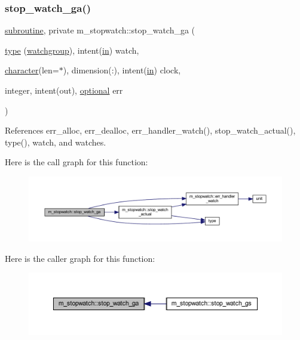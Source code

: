 \subsubsection{\texorpdfstring{stop\+\_\+watch\+\_\+ga()}{stop\_watch\_ga()}}
{\footnotesize\ttfamily \hyperlink{M__stopwatch_83_8txt_acfbcff50169d691ff02d4a123ed70482}{subroutine}, private m\+\_\+stopwatch\+::stop\+\_\+watch\+\_\+ga (\begin{DoxyParamCaption}\item[{\hyperlink{stop__watch_83_8txt_a70f0ead91c32e25323c03265aa302c1c}{type} (\hyperlink{structm__stopwatch_1_1watchgroup}{watchgroup}), intent(\hyperlink{M__journal_83_8txt_afce72651d1eed785a2132bee863b2f38}{in})}]{watch,  }\item[{\hyperlink{option__stopwatch_83_8txt_abd4b21fbbd175834027b5224bfe97e66}{character}(len=$\ast$), dimension(\+:), intent(\hyperlink{M__journal_83_8txt_afce72651d1eed785a2132bee863b2f38}{in})}]{clock,  }\item[{integer, intent(out), \hyperlink{option__stopwatch_83_8txt_aa4ece75e7acf58a4843f70fe18c3ade5}{optional}}]{err }\end{DoxyParamCaption})\hspace{0.3cm}{\ttfamily [private]}}



References err\+\_\+alloc, err\+\_\+dealloc, err\+\_\+handler\+\_\+watch(), stop\+\_\+watch\+\_\+actual(), type(), watch, and watches.

Here is the call graph for this function\+:
\nopagebreak
\begin{figure}[H]
\begin{center}
\leavevmode
\includegraphics[width=350pt]{namespacem__stopwatch_a4e078bf14eb68674747cdb6970444f96_cgraph}
\end{center}
\end{figure}
Here is the caller graph for this function\+:
\nopagebreak
\begin{figure}[H]
\begin{center}
\leavevmode
\includegraphics[width=350pt]{namespacem__stopwatch_a4e078bf14eb68674747cdb6970444f96_icgraph}
\end{center}
\end{figure}
\mbox{\label{namespacem__stopwatch_afc518d20fded06c7da4a9eba0df5e41a}} 
